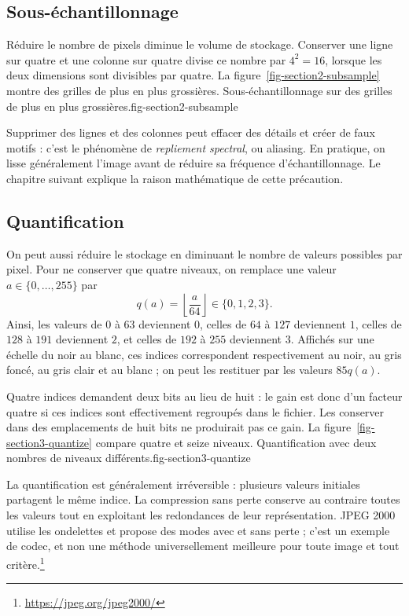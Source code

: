 \subsection{Sous-échantillonnage}
Réduire le nombre de pixels diminue le volume de stockage. Conserver une ligne sur quatre et une colonne sur quatre divise ce nombre par $4^2=16$, lorsque les deux dimensions sont divisibles par quatre. La figure~\ref{fig-section2-subsample} montre des grilles de plus en plus grossières.
{Sous-échantillonnage sur des grilles de plus en plus grossières.}{fig-section2-subsample}

Supprimer des lignes et des colonnes peut effacer des détails et créer de faux motifs : c'est le phénomène de \emph{repliement spectral}, ou aliasing. En pratique, on lisse généralement l'image avant de réduire sa fréquence d'échantillonnage. Le chapitre suivant explique la raison mathématique de cette précaution.

\subsection{Quantification}
On peut aussi réduire le stockage en diminuant le nombre de valeurs possibles par pixel. Pour ne conserver que quatre niveaux, on remplace une valeur $a\in\{0,\ldots,255\}$ par
\[
 q(a)=\left\lfloor\frac a{64}\right\rfloor\in\{0,1,2,3\}.
\]
Ainsi, les valeurs de $0$ à $63$ deviennent $0$, celles de $64$ à $127$ deviennent $1$, celles de $128$ à $191$ deviennent $2$, et celles de $192$ à $255$ deviennent $3$. Affichés sur une échelle du noir au blanc, ces indices correspondent respectivement au noir, au gris foncé, au gris clair et au blanc ; on peut les restituer par les valeurs $85q(a)$.

Quatre indices demandent deux bits au lieu de huit : le gain est donc d'un facteur quatre si ces indices sont effectivement regroupés dans le fichier. Les conserver dans des emplacements de huit bits ne produirait pas ce gain. La figure~\ref{fig-section3-quantize} compare quatre et seize niveaux.
{Quantification avec deux nombres de niveaux différents.}{fig-section3-quantize}

La quantification est généralement irréversible : plusieurs valeurs initiales partagent le même indice. La compression sans perte conserve au contraire toutes les valeurs tout en exploitant les redondances de leur représentation. JPEG 2000 utilise les ondelettes et propose des modes avec et sans perte ; c'est un exemple de codec, et non une méthode universellement meilleure pour toute image et tout critère.\footnote{\url{https://jpeg.org/jpeg2000/}}

